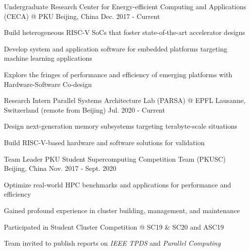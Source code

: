 

\begin{cventries}

  \cventry
    {Undergraduate Research} %
    {Center for Energy-efficient Computing and Applications (CECA) @ PKU} %
    {Beijing, China} %
    {Dec. 2017 - Current} %
    {
      \begin{cvitems} %
        \item {Build heterogeneous RISC-V SoCs that foster state-of-the-art accelerator designs}
        \item {Develop system and application software for embedded platforms targeting machine learning applications}
        \item {Explore the fringes of performance and efficiency of emerging platforms with Hardware-Software Co-design}
      \end{cvitems}
    }

  \cventry
    {Research Intern} %
    {Parallel Systems Architecture Lab (PARSA) @ EPFL} %
    {Lausanne, Switzerland \newline (remote from Beijing)} %
    {Jul. 2020 - Current} %
    {
      \begin{cvitems} %
        \item {Design next-generation memory subsystems targeting terabyte-scale situations}
        \item {Build RISC-V-based hardware and software solutions for validation}
      \end{cvitems}
    }

  \cventry
    {Team Leader} %
    {PKU Student Supercomputing Competition Team (PKUSC)} %
    {Beijing, China} %
    {Nov. 2017 - Sept. 2020} %
    {
      \begin{cvitems} %
        \item {Optimize real-world HPC benchmarks and applications for performance and efficiency}
        \item {Gained profound experience in cluster building, management, and maintenance}
        \item {Participated in Student Cluster Competition @ SC19 \& SC20 and ASC19}
        \item {Team invited to publish reports on \textit{IEEE TPDS} and \textit{Parallel Computing}}
      \end{cvitems}
    }


\end{cventries}
